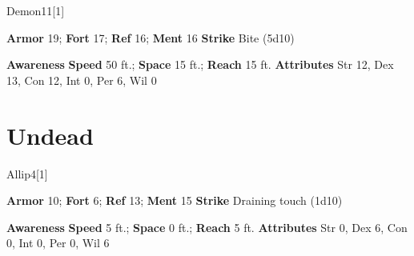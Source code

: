 \begin{monsection}[Bebelith]{Demon}{11}[1]
\vspace{-1em}\vspace{-1em}
\begin{spellcontent}
\begin{spelltargetinginfo}
\pari \textbf{Armor} 19; \textbf{Fort} 17; \textbf{Ref} 16; \textbf{Ment} 16
\pari \textbf{Strike} Bite  (5d10)
\end{spelltargetinginfo}
\end{spellcontent}
\begin{spellsubcontent}
\begin{spellfooter}
\pari \textbf{Awareness} 
\pari \textbf{Speed} 50 ft.; \textbf{Space} 15 ft.; \textbf{Reach} 15 ft.
\pari \textbf{Attributes} Str 12, Dex 13, Con 12, Int 0, Per 6, Wil 0
\end{spellfooter}
\end{spellsubcontent}
\end{monsection}
\section{Undead}
\begin{monsection}{Allip}{4}[1]
\vspace{-1em}\vspace{-1em}
\begin{spellcontent}
\begin{spelltargetinginfo}
\pari \textbf{Armor} 10; \textbf{Fort} 6; \textbf{Ref} 13; \textbf{Ment} 15
\pari \textbf{Strike} Draining touch  (1d10)
\end{spelltargetinginfo}
\end{spellcontent}
\begin{spellsubcontent}
\begin{spellfooter}
\pari \textbf{Awareness} 
\pari \textbf{Speed} 5 ft.; \textbf{Space} 0 ft.; \textbf{Reach} 5 ft.
\pari \textbf{Attributes} Str 0, Dex 6, Con 0, Int 0, Per 0, Wil 6
\end{spellfooter}
\end{spellsubcontent}
\end{monsection}